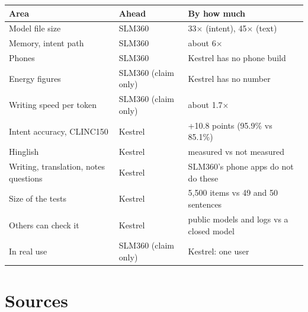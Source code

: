 \documentclass[11pt,a4paper]{article}
\begin{document}
\begin{center}
\begin{tabularx}{\textwidth}{@{}LlL@{}}
\toprule
\textbf{Area} & \textbf{Ahead} & \textbf{By how much} \\
\midrule
Model file size & SLM360 & 33$\times$ (intent), 45$\times$ (text) \\
Memory, intent path & SLM360 & about 6$\times$ \\
Phones & SLM360 & Kestrel has no phone build \\
Energy figures & SLM360 (claim only) & Kestrel has no number \\
Writing speed per token & SLM360 (claim only) & about 1.7$\times$ \\
Intent accuracy, CLINC150 & Kestrel & +10.8 points (95.9\% vs 85.1\%) \\
Hinglish & Kestrel & measured vs not measured \\
Writing, translation, notes questions & Kestrel & SLM360's phone apps do not do these \\
Size of the tests & Kestrel & 5,500 items vs 49 and 50 sentences \\
Others can check it & Kestrel & public models and logs vs a closed model \\
In real use & SLM360 (claim only) & Kestrel: one user \\
\bottomrule
\end{tabularx}
\end{center}

\appendix
\section{Sources}
\raggedright\small
\end{document}
